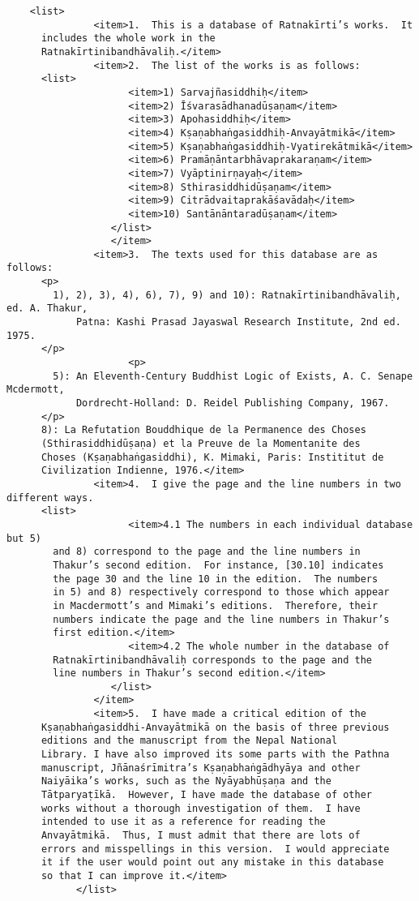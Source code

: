 \documentclass[article,12pt,a4paper]{memoir}
\begin{document}
\begin{verbatim}
	<list>
               <item>1.  This is a database of Ratnakīrti’s works.  It
	  includes the whole work in the
	  Ratnakīrtinibandhāvaliḥ.</item>
               <item>2.  The list of the works is as follows:
	  <list>
                     <item>1) Sarvajñasiddhiḥ</item>
                     <item>2) Īśvarasādhanadūṣaṇam</item>
                     <item>3) Apohasiddhiḥ</item>
                     <item>4) Kṣaṇabhaṅgasiddhiḥ-Anvayātmikā</item>
                     <item>5) Kṣaṇabhaṅgasiddhiḥ-Vyatirekātmikā</item>
                     <item>6) Pramāṇāntarbhāvaprakaraṇam</item>
                     <item>7) Vyāptinirṇayaḥ</item>
                     <item>8) Sthirasiddhidūṣaṇam</item>
                     <item>9) Citrādvaitaprakāśavādaḥ</item>
                     <item>10) Santānāntaradūṣaṇam</item>
                  </list>
	              </item>
               <item>3.  The texts used for this database are as follows:
	  <p>
	    1), 2), 3), 4), 6), 7), 9) and 10): Ratnakīrtinibandhāvaliḥ, ed. A. Thakur, 
            Patna: Kashi Prasad Jayaswal Research Institute, 2nd ed. 1975.
	  </p>
	                 <p>
	    5): An Eleventh-Century Buddhist Logic of Exists, A. C. Senape Mcdermott, 
            Dordrecht-Holland: D. Reidel Publishing Company, 1967.
	  </p>
	  8): La Refutation Bouddhique de la Permanence des Choses
	  (Sthirasiddhidūṣaṇa) et la Preuve de la Momentanite des
	  Choses (Kṣaṇabhaṅgasiddhi), K. Mimaki, Paris: Instititut de
	  Civilization Indienne, 1976.</item>
               <item>4.  I give the page and the line numbers in two different ways.
	  <list>
                     <item>4.1 The numbers in each individual database but 5)
	    and 8) correspond to the page and the line numbers in
	    Thakur’s second edition.  For instance, [30.10] indicates
	    the page 30 and the line 10 in the edition.  The numbers
	    in 5) and 8) respectively correspond to those which appear
	    in Macdermott’s and Mimaki’s editions.  Therefore, their
	    numbers indicate the page and the line numbers in Thakur’s
	    first edition.</item>
                     <item>4.2 The whole number in the database of
	    Ratnakīrtinibandhāvaliḥ corresponds to the page and the
	    line numbers in Thakur’s second edition.</item>
                  </list>
               </item>
               <item>5.  I have made a critical edition of the
	  Kṣaṇabhaṅgasiddhi-Anvayātmikā on the basis of three previous
	  editions and the manuscript from the Nepal National
	  Library. I have also improved its some parts with the Pathna
	  manuscript, Jñānaśrīmitra’s Kṣaṇabhaṅgādhyāya and other
	  Naiyāika’s works, such as the Nyāyabhūṣaṇa and the
	  Tātparyaṭīkā.  However, I have made the database of other
	  works without a thorough investigation of them.  I have
	  intended to use it as a reference for reading the
	  Anvayātmikā.  Thus, I must admit that there are lots of
	  errors and misspellings in this version.  I would appreciate
	  it if the user would point out any mistake in this database
	  so that I can improve it.</item>
            </list>


\end{verbatim}
\end{document}
